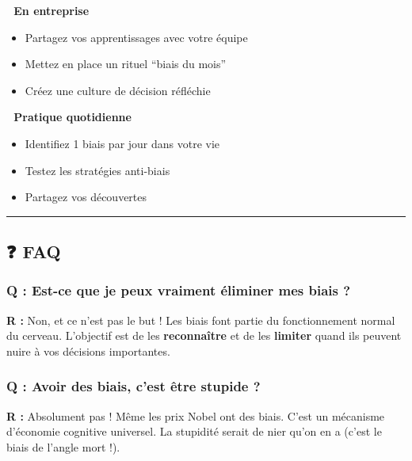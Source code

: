 \documentclass[
]{article}
\providecommand{\tightlist}{%
  \setlength{\itemsep}{0pt}\setlength{\parskip}{0pt}}
\begin{document}
\textbf{🏢 En entreprise}

\begin{itemize}
\tightlist
\item
  Partagez vos apprentissages avec votre équipe
\item
  Mettez en place un rituel ``biais du mois''
\item
  Créez une culture de décision réfléchie
\end{itemize}

\textbf{🔄 Pratique quotidienne}

\begin{itemize}
\tightlist
\item
  Identifiez 1 biais par jour dans votre vie
\item
  Testez les stratégies anti-biais
\item
  Partagez vos découvertes
\end{itemize}

\begin{center}\rule{0.5\linewidth}{0.5pt}\end{center}

\subsection{❓ FAQ}\label{faq}

\subsubsection{\texorpdfstring{\textbf{Q : Est-ce que je peux vraiment
éliminer mes biais
?}}{Q : Est-ce que je peux vraiment éliminer mes biais ?}}\label{q-est-ce-que-je-peux-vraiment-uxe9liminer-mes-biais}

\textbf{R :} Non, et ce n'est pas le but ! Les biais font partie du
fonctionnement normal du cerveau. L'objectif est de les
\textbf{reconnaître} et de les \textbf{limiter} quand ils peuvent nuire
à vos décisions importantes.

\subsubsection{\texorpdfstring{\textbf{Q : Avoir des biais, c'est être
stupide
?}}{Q : Avoir des biais, c'est être stupide ?}}\label{q-avoir-des-biais-cest-uxeatre-stupide}

\textbf{R :} Absolument pas ! Même les prix Nobel ont des biais. C'est
un mécanisme d'économie cognitive universel. La stupidité serait de nier
qu'on en a (c'est le biais de l'angle mort !).
\end{document}
